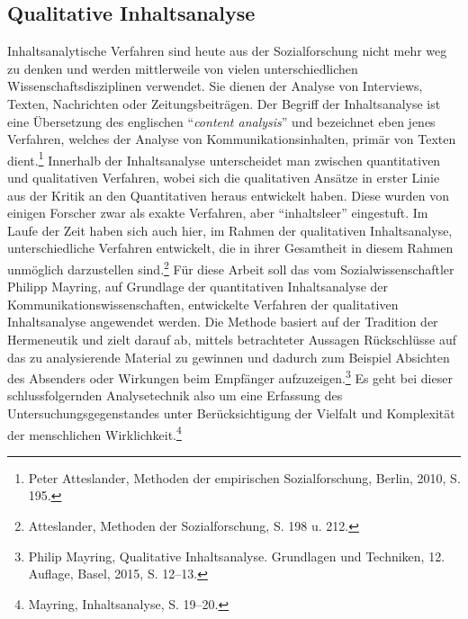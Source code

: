 \documentclass[
    a4paper,
    12pt,
    hyphens,
    chapterprefix=true,
    headheight=33pt,
    footheight=29pt,
    headings=optiontohead, %
]{scrartcl}
\begin{document}
\subsection{Qualitative Inhaltsanalyse}
Inhaltsanalytische Verfahren sind heute aus der Sozialforschung nicht mehr weg zu denken und werden mittlerweile von vielen unterschiedlichen Wissenschaftsdisziplinen verwendet. Sie dienen der Analyse von Interviews, Texten, Nachrichten oder Zeitungsbeiträgen. Der Begriff der Inhaltsanalyse ist eine Übersetzung des englischen "`\textit{content analysis}"' und bezeichnet eben jenes Verfahren, welches der Analyse von Kommunikationsinhalten, primär von Texten dient.\footnote{Peter Atteslander, Methoden der empirischen Sozialforschung, Berlin, 2010, S. 195.} Innerhalb der Inhaltsanalyse unterscheidet man zwischen quantitativen und qualitativen Verfahren, wobei sich die qualitativen Ansätze in erster Linie aus der Kritik an den Quantitativen heraus entwickelt haben. Diese wurden von einigen Forscher zwar als exakte Verfahren, aber "`inhaltsleer"' eingestuft. Im Laufe der Zeit haben sich auch hier, im Rahmen der qualitativen Inhaltsanalyse, unterschiedliche Verfahren entwickelt, die in ihrer Gesamtheit in diesem Rahmen unmöglich darzustellen sind.\footnote{Atteslander, Methoden der Sozialforschung, S. 198 u. 212.} Für diese Arbeit soll das vom Sozialwissenschaftler Philipp Mayring, auf Grundlage der quantitativen Inhaltsanalyse der Kommunikationswissenschaften, entwickelte Verfahren der qualitativen Inhaltsanalyse angewendet werden. Die Methode basiert auf der Tradition der Hermeneutik und zielt darauf ab, mittels betrachteter Aussagen Rückschlüsse auf das zu analysierende Material zu gewinnen und dadurch zum Beispiel Absichten des Absenders oder Wirkungen beim Empfänger aufzuzeigen.\footnote{Philip Mayring, Qualitative Inhaltsanalyse. Grundlagen und Techniken, 12. Auflage, Basel, 2015, S. 12--13.} Es geht bei dieser schlussfolgernden Analysetechnik also um eine Erfassung des Untersuchungsgegenstandes unter Berücksichtigung der Vielfalt und Komplexität der menschlichen Wirklichkeit.\footnote{Mayring, Inhaltsanalyse, S. 19--20.}\\
\end{document}
